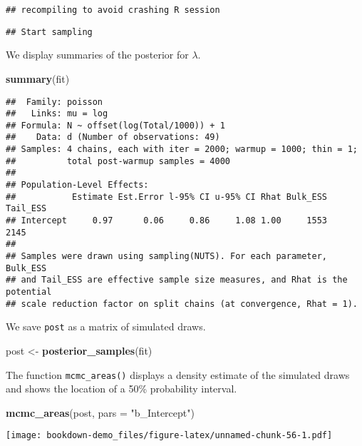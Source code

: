 \documentclass[
]{book}
\newenvironment{Shaded}{\begin{snugshade}}{\end{snugshade}}
\newcommand{\DataTypeTok}[1]{\textcolor[rgb]{0.13,0.29,0.53}{#1}}
\newcommand{\KeywordTok}[1]{\textcolor[rgb]{0.13,0.29,0.53}{\textbf{#1}}}
\newcommand{\NormalTok}[1]{#1}
\newcommand{\StringTok}[1]{\textcolor[rgb]{0.31,0.60,0.02}{#1}}
\begin{document}
\begin{verbatim}
## recompiling to avoid crashing R session
\end{verbatim}

\begin{verbatim}
## Start sampling
\end{verbatim}

We display summaries of the posterior for \(\lambda\).

\begin{Shaded}
\begin{Highlighting}[]
\KeywordTok{summary}\NormalTok{(fit)}
\end{Highlighting}
\end{Shaded}

\begin{verbatim}
##  Family: poisson 
##   Links: mu = log 
## Formula: N ~ offset(log(Total/1000)) + 1 
##    Data: d (Number of observations: 49) 
## Samples: 4 chains, each with iter = 2000; warmup = 1000; thin = 1;
##          total post-warmup samples = 4000
## 
## Population-Level Effects: 
##           Estimate Est.Error l-95% CI u-95% CI Rhat Bulk_ESS Tail_ESS
## Intercept     0.97      0.06     0.86     1.08 1.00     1553     2145
## 
## Samples were drawn using sampling(NUTS). For each parameter, Bulk_ESS
## and Tail_ESS are effective sample size measures, and Rhat is the potential
## scale reduction factor on split chains (at convergence, Rhat = 1).
\end{verbatim}

We save \texttt{post} as a matrix of simulated draws.

\begin{Shaded}
\begin{Highlighting}[]
\NormalTok{post <-}\StringTok{ }\KeywordTok{posterior_samples}\NormalTok{(fit)}
\end{Highlighting}
\end{Shaded}

The function \texttt{mcmc\_areas()} displays a density estimate of the simulated draws and shows the location of a 50\% probability interval.

\begin{Shaded}
\begin{Highlighting}[]
\KeywordTok{mcmc_areas}\NormalTok{(post, }\DataTypeTok{pars =} \StringTok{"b_Intercept"}\NormalTok{)}
\end{Highlighting}
\end{Shaded}

\texttt{[image: bookdown-demo\_files/figure-latex/unnamed-chunk-56-1.pdf]}
\end{document}
